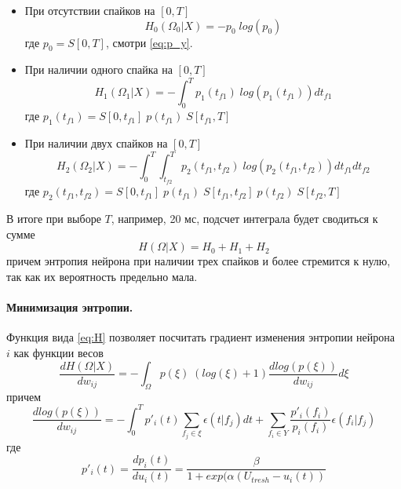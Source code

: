 \documentclass[a4paper,10pt]{article}
\begin{document}
\begin{itemize}
\item При отсутствии спайков на $[0,T]$
\begin{equation}\label{eq:H0}
H_{0}(\Omega_{0}|X) = -p_{0}\;log(p_{0}) 
\end{equation}
где $p_{0} = S[0,T]$, смотри \ref{eq:p_y}.
\item При наличии одного спайка на $[0,T]$
\begin{equation}\label{eq:H1}
H_{1}(\Omega_{1}|X) = -\int_{0}^{T} p_{1}(t_{f1})\;log(p_{1}(t_{f1})) dt_{f1}
\end{equation}
где $p_{1}(t_{f1}) = S[0,t_{f1}] \; p(t_{f1}) \; S[t_{f1},T]$
\item При наличии двух спайков на $[0,T]$
\begin{equation}\label{eq:H2}
H_{2}(\Omega_{2}|X) = -\int_{0}^{T} \int_{t_{f2}}^{T} p_{2}(t_{f1},t_{f2})\;log(p_{2}(t_{f1},t_{f2})) dt_{f1} dt_{f2}
\end{equation}
где $p_{2}(t_{f1},t_{f2}) = S[0,t_{f1}] \; p(t_{f1}) \;  S[t_{f1},t_{f2}] \;  p(t_{f2})\; S[t_{f2},T]$
\end{itemize}
\indent В итоге при выборе $T$, например, 20 мс, подсчет интеграла \label{eq:H} будет сводиться к сумме
\begin{equation}\label{eq:Hsum}
H(\Omega|X) = H_{0} + H_{1} + H_{2}
\end{equation}
причем энтропия нейрона при наличии трех спайков и более стремится к нулю, так как их вероятность предельно мала.
\paragraph*{Минимизация энтропии.} Функция вида \ref{eq:H} позволяет посчитать градиент изменения энтропии нейрона $i$ как функции весов
\begin{equation}\label{eq:Hgrad}
\frac{dH(\Omega|X)}{dw_{ij}} = -\int_{\Omega} p(\xi)\;(log(\xi)+1)\frac{dlog(p(\xi))}{dw_{ij}}d\xi
\end{equation}
причем
\begin{equation}\label{eq:dlog}
\frac{dlog(p(\xi))}{dw_{ij}} = -\int_{0}^{T} p'_{i}(t)\sum_{f_{j}\in \xi}\epsilon(t|f_{j})dt +\sum_{f_{i}\in Y}\frac{p'_{i}(f_{i})}{p_{i}(f_{i})}\epsilon(f_{i}|f_{j})
\end{equation}
где
\begin{equation}\label{eq:pstroke}
p'_{i}(t)=\frac{dp_{i}(t)}{du_{i}(t)} = \frac{\beta}{1+exp(\alpha(U_{tresh}-u_{i}(t))}
\end{equation}
\end{document}
